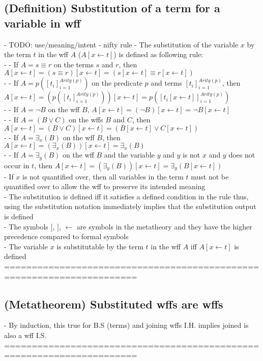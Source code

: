 \documentclass{article}
\begin{document}
\subsection{(Definition) Substitution of a term for a variable in wff}
	- TODO: use/meaning/intent - nifty rule
	- The substitution of the variable $x$ by the term $t$ in the wff $A$ ($A[x \leftarrow t]$) is defined as following rule: \\
		- - If $A = s \equiv r$ on the terms $s$ and $r$, then $A[x \leftarrow t] = (s \equiv r)[x \leftarrow t] = (s[x \leftarrow t] \equiv r[x \leftarrow t])$ \\
		- - If $A = p([t_i]_{i=1}^{Arity(p)})$ on the predicate $p$ and terms $[t_i]_{i=1}^{Arity(p)}$, then $A[x \leftarrow t] = (p([t_i]_{i=1}^{Arity(p)}))[x \leftarrow t] = p([t_i[x \leftarrow t]]_{i=1}^{Arity(p)})$ \\
		- - If $A = \lnot B$ on the wff $B$, $A[x \leftarrow t] = (\lnot B)[x \leftarrow t] = \lnot B[x \leftarrow t]$ \\
		- - If $A = (B \lor C)$ on the wffs $B$ and $C$, then $A[x \leftarrow t] = (B \lor C)[x \leftarrow t] = (B[x \leftarrow t] \lor C[x \leftarrow t])$\\
		- - If $A = \exists_x(B)$ on the wff $B$, then $A[x \leftarrow t] = (\exists_x(B))[x \leftarrow t] = \exists_x(B)$ \\
		- - If $A = \exists_y(B)$ on the wff $B$ and the variable $y$ and $y$ is not $x$ and $y$ does not occur in $t$, then $A[x \leftarrow t] = (\exists_y(B))[x \leftarrow t] = \exists_y(B[x \leftarrow t])$ \\
	- If $x$ is not quantified over, then all variables in the term $t$ must not be quantified over to allow the wff to preserve its intended meaning \\
	- The substitution is defined iff it satisfies a defined condition in the rule thus, using the substitution notation immediately implies that the substitution output is defined \\
	- The symbols $[$, $]$, $\leftarrow$ are symbols in the metatheory and they have the higher precedence compared to formal symbols \\
	- The variable $x$ is substitutable by the term $t$ in the wff $A$ iff $A[x \leftarrow t]$ is defined 
	======================================================================
\subsection{(Metatheorem) Substituted wffs are wffs}
	- By induction, this true for B.S (terms) and joining wffs I.H. implies joined is also a wff I.S. \\
	======================================================================
\end{document}
